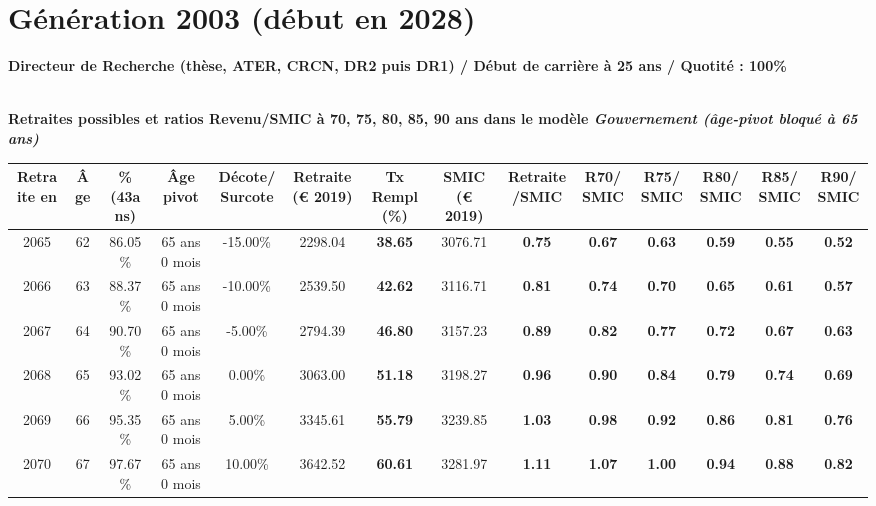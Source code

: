 \newpage 
 
\section{Génération 2003 (début en 2028)\label{DR_100_2003_25_0}} 
 
{\bf \noindent Directeur de Recherche (thèse, ATER, CRCN, DR2 puis DR1) / Début de carrière à 25 ans / Quotité : 100\%}  ~ 

 ~\\{\bf \noindent Retraites possibles et ratios Revenu/SMIC à 70, 75, 80, 85, 90 ans dans le modèle \emph{Gouvernement (âge-pivot bloqué à 65 ans)}}  
 
\begin{adjustbox}{max width=\textwidth} 
\begin{tabular}[htb]{|c|c||c|c|c||c|c||c|c||c|c|c|c|c|} 
\hline 
 Retraite en &  Âge &  \%(43ans) &  Âge pivot &  Décote/Surcote &  Retraite (\euro{} 2019) &  Tx Rempl(\%) &  SMIC (\euro{} 2019) &  Retraite/SMIC &  R70/SMIC &  R75/SMIC &  R80/SMIC &  R85/SMIC &  R90/SMIC \\ 
\hline \hline 
 2065 &  62 &  86.05\% &  65 ans 0 mois &  -15.00\% &  2298.04 &  {\bf 38.65} &  3076.71 &  {\bf {\color{red} 0.75}} &  {\bf {\color{red} 0.67}} &  {\bf {\color{red} 0.63}} &  {\bf {\color{red} 0.59}} &  {\bf {\color{red} 0.55}} &  {\bf {\color{red} 0.52}} \\ 
\hline 
 2066 &  63 &  88.37\% &  65 ans 0 mois &  -10.00\% &  2539.50 &  {\bf 42.62} &  3116.71 &  {\bf {\color{red} 0.81}} &  {\bf {\color{red} 0.74}} &  {\bf {\color{red} 0.70}} &  {\bf {\color{red} 0.65}} &  {\bf {\color{red} 0.61}} &  {\bf {\color{red} 0.57}} \\ 
\hline 
 2067 &  64 &  90.70\% &  65 ans 0 mois &  -5.00\% &  2794.39 &  {\bf 46.80} &  3157.23 &  {\bf {\color{red} 0.89}} &  {\bf {\color{red} 0.82}} &  {\bf {\color{red} 0.77}} &  {\bf {\color{red} 0.72}} &  {\bf {\color{red} 0.67}} &  {\bf {\color{red} 0.63}} \\ 
\hline 
 2068 &  65 &  93.02\% &  65 ans 0 mois &  0.00\% &  3063.00 &  {\bf 51.18} &  3198.27 &  {\bf {\color{red} 0.96}} &  {\bf {\color{red} 0.90}} &  {\bf {\color{red} 0.84}} &  {\bf {\color{red} 0.79}} &  {\bf {\color{red} 0.74}} &  {\bf {\color{red} 0.69}} \\ 
\hline 
 2069 &  66 &  95.35\% &  65 ans 0 mois &  5.00\% &  3345.61 &  {\bf 55.79} &  3239.85 &  {\bf 1.03} &  {\bf {\color{red} 0.98}} &  {\bf {\color{red} 0.92}} &  {\bf {\color{red} 0.86}} &  {\bf {\color{red} 0.81}} &  {\bf {\color{red} 0.76}} \\ 
\hline 
 2070 &  67 &  97.67\% &  65 ans 0 mois &  10.00\% &  3642.52 &  {\bf 60.61} &  3281.97 &  {\bf 1.11} &  {\bf 1.07} &  {\bf 1.00} &  {\bf {\color{red} 0.94}} &  {\bf {\color{red} 0.88}} &  {\bf {\color{red} 0.82}} \\ 
\hline 
\hline 
\end{tabular} 
\end{adjustbox} 
 
